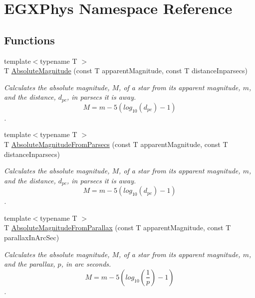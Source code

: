 \hypertarget{namespace_e_g_x_phys}{}\section{E\+G\+X\+Phys Namespace Reference}
\label{namespace_e_g_x_phys}
\subsection*{Functions}
\begin{DoxyCompactItemize}
\item 
{\footnotesize template$<$typename T $>$ }\\T \mbox{\hyperlink{group___e_g_x_phys-_astrophysics-_absolute_magnitude_ga2ddb255fa28972334d82f377ce182048}{Absolute\+Magnitude}} (const T apparent\+Magnitude, const T distance\+Inparsecs)
\begin{DoxyCompactList}\small\item\em Calculates the absolute magnitude, $M$, of a star from its apparent magnitude, $m$, and the distance, $d_{pc}$, in parsecs it is away. \[M= m - 5 \left ( log_{10}(d_{pc}) - 1 \right )\]. \end{DoxyCompactList}\item 
{\footnotesize template$<$typename T $>$ }\\T \mbox{\hyperlink{group___e_g_x_phys-_astrophysics-_absolute_magnitude_ga6eb3d93ce8d6ff1e0cc288059225ff9a}{Absolute\+Magnitude\+From\+Parsecs}} (const T apparent\+Magnitude, const T distance\+Inparsecs)
\begin{DoxyCompactList}\small\item\em Calculates the absolute magnitude, $M$, of a star from its apparent magnitude, $m$, and the distance, $d_{pc}$, in parsecs it is away. \[M= m - 5 \left ( log_{10}(d_{pc}) - 1 \right )\]. \end{DoxyCompactList}\item 
{\footnotesize template$<$typename T $>$ }\\T \mbox{\hyperlink{group___e_g_x_phys-_astrophysics-_absolute_magnitude_ga057faec7c22e76e31ad65bf2f98e0d58}{Absolute\+Magnitude\+From\+Parallax}} (const T apparent\+Magnitude, const T parallax\+In\+Arc\+Sec)
\begin{DoxyCompactList}\small\item\em Calculates the absolute magnitude, $M$, of a star from its apparent magnitude, $m$, and the parallax, $p$, in arc seconds. \[M= m - 5 \left ( log_{10} \left ( \dfrac{1}{p} \right ) - 1 \right )\]. \end{DoxyCompactList}\item 

\end{DoxyCompactItemize}
